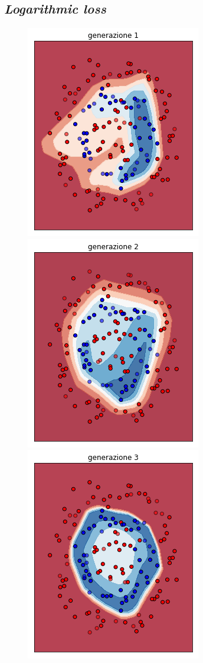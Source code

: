 \documentclass[12pt,a4paper]{report}
\begin{document}
\subsection{\textit{Logarithmic loss}}

\begin{figure}[H]
 \centering
 \includegraphics[scale = 0.37]{images/circle+-rnd-log./1}
 \includegraphics[scale = 0.37]{images/circle+-rnd-log./2}
 \includegraphics[scale = 0.37]{images/circle+-rnd-log./3}

\end{figure}
\end{document}
